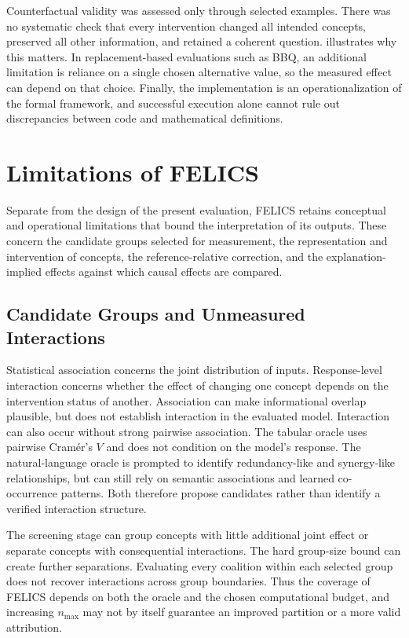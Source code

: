Counterfactual validity was assessed only through selected examples. There was no systematic check that every intervention changed all intended concepts, preserved all other information, and retained a coherent question.  illustrates why this matters. In replacement-based evaluations such as BBQ, an additional limitation is reliance on a single chosen alternative value, so the measured effect can depend on that choice. Finally, the implementation is an operationalization of the formal framework, and successful execution alone cannot rule out discrepancies between code and mathematical definitions.

\section{Limitations of FELICS}
\label{sec:felics_limitations}

Separate from the design of the present evaluation, FELICS retains conceptual and operational limitations that bound the interpretation of its outputs. These concern the candidate groups selected for measurement, the representation and intervention of concepts, the reference-relative correction, and the explanation-implied effects against which causal effects are compared.

\subsection{Candidate Groups and Unmeasured Interactions}

Statistical association concerns the joint distribution of inputs. Response-level interaction concerns whether the effect of changing one concept depends on the intervention status of another. Association can make informational overlap plausible, but does not establish interaction in the evaluated model. Interaction can also occur without strong pairwise association. The tabular oracle uses pairwise Cram\'er's $V$ and does not condition on the model's response. The natural-language oracle is prompted to identify redundancy-like and synergy-like relationships, but can still rely on semantic associations and learned co-occurrence patterns. Both therefore propose candidates rather than identify a verified interaction structure.

The screening stage can group concepts with little additional joint effect or separate concepts with consequential interactions. The hard group-size bound can create further separations. Evaluating every coalition within each selected group does not recover interactions across group boundaries. Thus the coverage of FELICS depends on both the oracle and the chosen computational budget, and increasing $n_{\max}$ may not by itself guarantee an improved partition or a more valid attribution.

